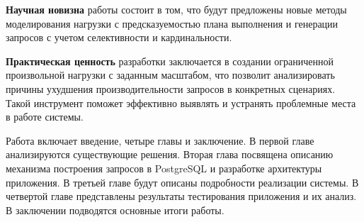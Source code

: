 \textbf{Научная новизна} работы состоит в том, что будут предложены новые методы моделирования нагрузки с предсказуемостью плана выполнения и генерации запросов с учетом селективности и кардинальности.

\textbf{Практическая ценность} разработки заключается в создании ограниченной произвольной нагрузки с заданным масштабом, что позволит анализировать причины ухудшения производительности запросов в конкретных сценариях. Такой инструмент поможет эффективно выявлять и устранять проблемные места в работе системы. 

Работа включает введение, четыре главы и заключение. В первой главе анализируются существующие решения. Вторая глава посвящена описанию механизма построения запросов в PostgreSQL и разработке архитектуры приложения. В третьей главе будут описаны подробности реализации системы. В четвертой главе представлены результаты тестирования приложения и их анализ. В заключении подводятся основные итоги работы.

